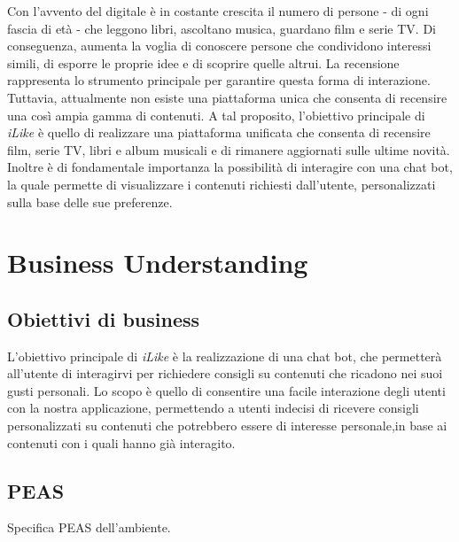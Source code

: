 \documentclass[a4paper, 12pt]{report}
\begin{document}
    Con l'avvento del digitale è in costante crescita il numero di persone - di ogni fascia di età - che leggono libri, ascoltano musica,
    guardano film e serie TV. Di conseguenza, aumenta la voglia di conoscere persone che condividono interessi simili, di esporre le proprie idee e
    di scoprire quelle altrui. La recensione rappresenta lo strumento principale per garantire questa forma di interazione. Tuttavia, attualmente non esiste
    una piattaforma unica che consenta di recensire una così ampia gamma di contenuti. A tal proposito, l’obiettivo principale di \textit{iLike} è quello di realizzare
    una piattaforma unificata che consenta di recensire film, serie TV, libri e album musicali e di rimanere aggiornati sulle ultime novità.
    Inoltre è di fondamentale importanza la possibilità di interagire con una chat bot, la quale permette di visualizzare i contenuti richiesti dall’utente,
    personalizzati sulla base delle sue preferenze.



    \chapter{Business Understanding}\label{ch:business-understanding}


        \section{Obiettivi di business}\label{sec:obiettivi-di-business}

        L’obiettivo principale di \textit{iLike} è la realizzazione di una chat bot, che permetterà all’utente di interagirvi
        per richiedere consigli su contenuti che ricadono nei suoi gusti personali.
        Lo scopo è quello di consentire una facile interazione degli utenti con la nostra applicazione, permettendo a utenti indecisi di ricevere
        consigli personalizzati su contenuti che potrebbero essere di interesse personale,in base ai contenuti con i quali hanno già interagito.

    \section{PEAS}\label{sec:peas}

            Specifica PEAS dell'ambiente.

                \paragraph{}
\end{document}
